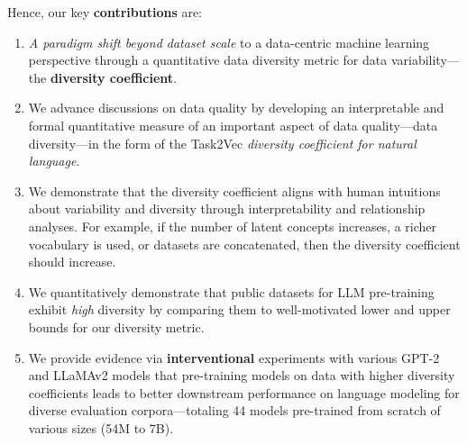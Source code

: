 Hence, our key \textbf{contributions} are:
\begin{enumerate}
    \item \textit{A paradigm shift beyond dataset scale} to a data-centric machine learning perspective through a quantitative data diversity metric for data variability---the \textbf{diversity coefficient}.
    \item We advance discussions on data quality by developing an interpretable and formal quantitative measure of an important aspect of data quality---data diversity---in the form of the Task2Vec \textit{diversity coefficient for natural language}.
    \item We demonstrate that the diversity coefficient aligns with human intuitions about variability and diversity through interpretability and relationship analyses.
    For example, if 
    the number of latent concepts increases, a richer vocabulary is used, or datasets are concatenated, then the diversity coefficient should increase.
    \item We quantitatively demonstrate that public datasets for LLM pre-training exhibit \textit{high} diversity by comparing them to well-motivated lower and upper bounds for our diversity metric.
    \item We provide evidence via \textbf{interventional} experiments with various GPT-2 and LLaMAv2 models that pre-training models on data with higher diversity coefficients leads to better downstream performance on language modeling for diverse evaluation corpora---totaling 44 models pre-trained from scratch of various sizes (54M  to 7B).
\end{enumerate}

